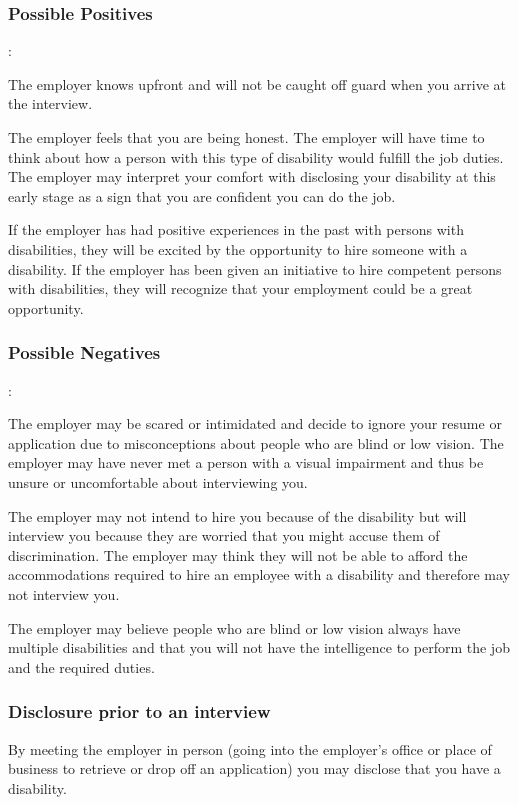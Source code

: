 \subsubsection*{Possible Positives}:

The employer knows upfront and will not be caught off guard when you arrive at the interview.

The employer feels that you are being honest. The employer will have time to think about how a person with this type of disability would fulfill the job duties.
The employer may interpret your comfort with disclosing your disability at this early stage as a sign that you are confident you can do the job.

If the employer has had positive experiences in the past with persons with disabilities, they will be excited by the opportunity to hire someone with a disability.
If the employer has been given an initiative to hire competent persons with disabilities, they will recognize that your employment could be a great opportunity.

\subsubsection*{Possible Negatives}:

The employer may be scared or intimidated and decide to ignore your resume or application due to misconceptions about people who are blind or low vision.
The employer may have never met a person with a visual impairment and thus be unsure or uncomfortable about interviewing you.

The employer may not intend to hire you because of the disability but will interview you because they are worried that you might accuse them of discrimination.
The employer may think they will not be able to afford the accommodations required to hire an employee with a disability and therefore may not interview you.

The employer may believe people who are blind or low vision always have multiple disabilities and that you will not have the intelligence to perform the job and the required duties.

\subsubsection*{Disclosure prior to an interview}

By meeting the employer in person (going into the employer's office or place of business to retrieve or drop off an application) you may disclose that you have a disability.

